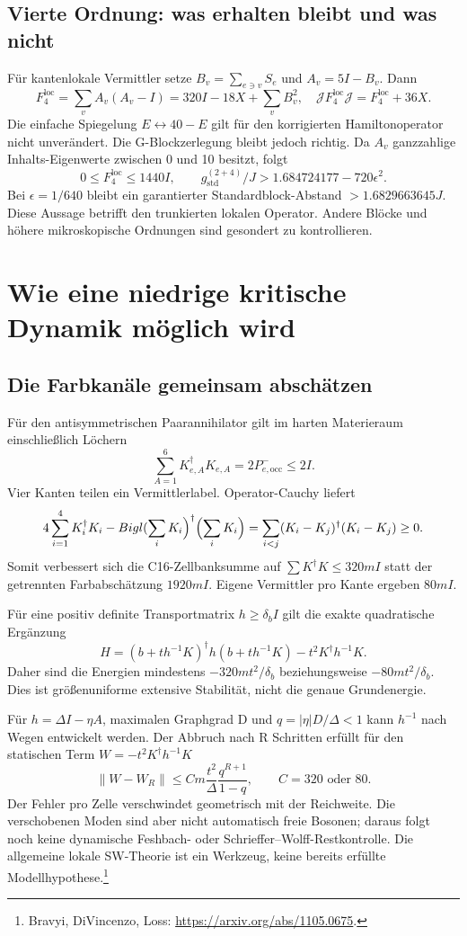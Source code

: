 \section{Vierte Ordnung: was erhalten bleibt und was nicht}
Für kantenlokale Vermittler setze $B_v=\sum_{e\ni v}S_e$ und $A_v=5I-B_v$. Dann
\[
F_4^\mathrm{loc}=\sum_v A_v(A_v-I)=320I-18X+\sum_vB_v^2,
\quad \mathcal JF_4^\mathrm{loc}\mathcal J=F_4^\mathrm{loc}+36X.
\]
Die einfache Spiegelung $E\leftrightarrow40-E$ gilt für den korrigierten Hamiltonoperator nicht unverändert. Die G-Blockzerlegung bleibt jedoch richtig. Da $A_v$ ganzzahlige Inhalts-Eigenwerte zwischen 0 und 10 besitzt, folgt
\[
0\le F_4^\mathrm{loc}\le1440I,
\qquad g_\mathrm{std}^{(2+4)}/J>1.684724177-720\epsilon^2.
\]
Bei $\epsilon=1/640$ bleibt ein garantierter Standardblock-Abstand $>1.6829663645J$. Diese Aussage betrifft den trunkierten lokalen Operator. Andere Blöcke und höhere mikroskopische Ordnungen sind gesondert zu kontrollieren.

\chapter{Wie eine niedrige kritische Dynamik möglich wird}
\label{ch:scaling15}
\section{Die Farbkanäle gemeinsam abschätzen}
Für den antisymmetrischen Paarannihilator gilt im harten Materieraum einschließlich Löchern
\[
\sum_{A=1}^6K_{e,A}^\dagger K_{e,A}=2P^-_{e,\mathrm{occ}}\le2I.
\]
Vier Kanten teilen ein Vermittlerlabel. Operator-Cauchy liefert
\[
4\sum_{i=1}^4K_i^\dagger K_i-Bigl(\sum_iK_i\Bigr)^\dagger
\Bigl(\sum_iK_i\Bigr)=\sum_{i<j}(K_i-K_j)^\dagger(K_i-K_j)\ge0.
\]
Somit verbessert sich die C16-Zellbanksumme auf $\sum K^\dagger K\le320mI$ statt der getrennten Farbabschätzung $1920mI$. Eigene Vermittler pro Kante ergeben $80mI$.

Für eine positiv definite Transportmatrix $h\ge\delta_bI$ gilt die exakte quadratische Ergänzung
\[
H=(b+th^{-1}K)^\dagger h(b+th^{-1}K)-t^2K^\dagger h^{-1}K.
\]
Daher sind die Energien mindestens $-320mt^2/\delta_b$ beziehungsweise $-80mt^2/\delta_b$. Dies ist größenuniforme extensive Stabilität, nicht die genaue Grundenergie.

Für $h=\Delta I-\eta A$, maximalen Graphgrad D und $q=|\eta|D/\Delta<1$ kann $h^{-1}$ nach Wegen entwickelt werden. Der Abbruch nach R Schritten erfüllt für den statischen Term $W=-t^2K^\dagger h^{-1}K$
\[
\|W-W_R\|\le Cm\frac{t^2}{\Delta}\frac{q^{R+1}}{1-q},\qquad C=320\text{ oder }80.
\]
Der Fehler pro Zelle verschwindet geometrisch mit der Reichweite. Die verschobenen Moden sind aber nicht automatisch freie Bosonen; daraus folgt noch keine dynamische Feshbach- oder Schrieffer--Wolff-Restkontrolle. Die allgemeine lokale SW-Theorie ist ein Werkzeug, keine bereits erfüllte Modellhypothese.\footnote{Bravyi, DiVincenzo, Loss: \url{https://arxiv.org/abs/1105.0675}.}

